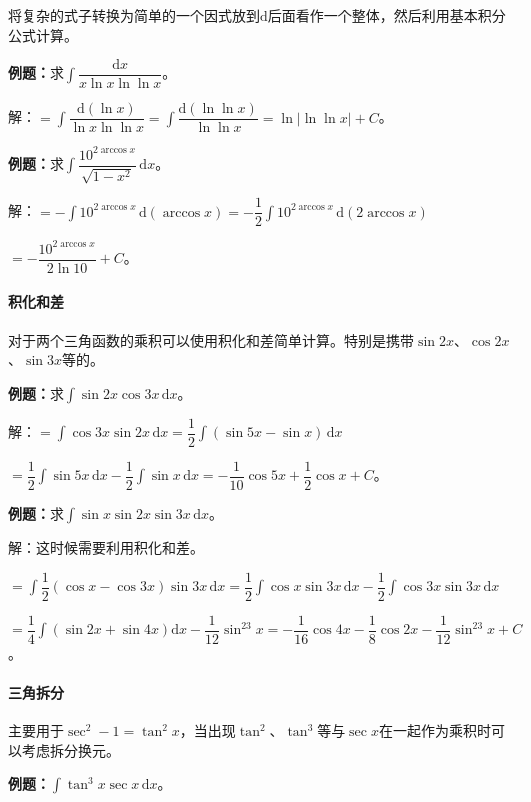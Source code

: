 \documentclass[UTF8, 12pt]{ctexart}
\begin{document}
将复杂的式子转换为简单的一个因式放到$\textrm{d}$后面看作一个整体，然后利用基本积分公式计算。

\textbf{例题：}求$\displaystyle{\int\dfrac{\textrm{d}x}{x\ln x\ln\ln x}}$。 \medskip

解：$=\displaystyle{\int\dfrac{\textrm{d}(\ln x)}{\ln x\ln\ln x}}=\displaystyle{\int\dfrac{\textrm{d}(\ln\ln x)}{\ln\ln x}}=\ln\vert\ln\ln x\vert+C$。\medskip

\textbf{例题：}求$\displaystyle{\int\dfrac{10^{2\arccos x}}{\sqrt{1-x^2}}\,\textrm{d}x}$。

解：$=-\displaystyle{\int10^{2\arccos x}\,\textrm{d}(\arccos x)}=-\dfrac{1}{2}\displaystyle{\int10^{2\arccos x}\,\textrm{d}(2\arccos x)}$

$=-\dfrac{10^{2\arccos x}}{2\ln10}+C$。

\paragraph{积化和差} \leavevmode \medskip

对于两个三角函数的乘积可以使用积化和差简单计算。特别是携带$\sin2x$、$\cos2x$、$\sin3x$等的。

\textbf{例题：}求$\displaystyle{\int\sin2x\cos3x\,\textrm{d}x}$。

解：$=\displaystyle{\int\cos3x\sin2x\,\textrm{d}x=\dfrac{1}{2}\int(\sin5x-\sin x)\,\textrm{d}x}$

$=\dfrac{1}{2}\int\sin5x\,\textrm{d}x-\dfrac{1}{2}\int\sin x\,\textrm{d}x=-\dfrac{1}{10}\cos5x+\dfrac{1}{2}\cos x+C$。

\textbf{例题：}求$\int\sin x\sin2x\sin3x\,\textrm{d}x$。

解：这时候需要利用积化和差。

$=\displaystyle{\int\dfrac{1}{2}(\cos x-\cos3x)\sin3x\,\textrm{d}x=\dfrac{1}{2}\int\cos x\sin3x\,\textrm{d}x-\dfrac{1}{2}\int\cos3x\sin3x\,\textrm{d}x}$

$=\dfrac{1}{4}\int(\sin2x+\sin4x)\textrm{d}x-\dfrac{1}{12}\sin^23x=-\dfrac{1}{16}\cos4x-\dfrac{1}{8}\cos2x-\dfrac{1}{12}\sin^23x+C$。

\paragraph{三角拆分} \leavevmode \medskip

主要用于$\sec^2-1=\tan^2x$，当出现$\tan^2$、$\tan^3$等与$\sec x$在一起作为乘积时可以考虑拆分换元。

\textbf{例题：}$\displaystyle{\int\tan^3x\sec x\,\textrm{d}x}$。
\end{document}
